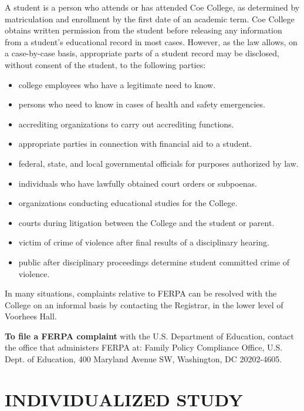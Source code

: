 \documentclass[
  letterpaper,
]{scrbook}
\providecommand{\tightlist}{%
  \setlength{\itemsep}{0pt}\setlength{\parskip}{0pt}}
\renewcommand{\part}[1]{\addcontentsline{toc}{part}{#1}}
\begin{document}
A student is a person who attends or has attended Coe College, as
determined by matriculation and enrollment by the first date of an
academic term. Coe College obtains written permission from the student
before releasing any information from a student's educational record in
most cases. However, as the law allows, on a case-by-case basis,
appropriate parts of a student record may be disclosed, without consent
of the student, to the following parties:

\begin{itemize}
\tightlist
\item
  college employees who have a legitimate need to know.
\item
  persons who need to know in cases of health and safety emergencies.
\item
  accrediting organizations to carry out accrediting functions.
\item
  appropriate parties in connection with financial aid to a student.
\item
  federal, state, and local governmental officials for purposes
  authorized by law.
\item
  individuals who have lawfully obtained court orders or subpoenas.
\item
  organizations conducting educational studies for the College.
\item
  courts during litigation between the College and the student or
  parent.
\item
  victim of crime of violence after final results of a disciplinary
  hearing.
\item
  public after disciplinary proceedings determine student committed
  crime of violence.
\end{itemize}

In many situations, complaints relative to FERPA can be resolved with
the College on an informal basis by contacting the Registrar, in the
lower level of Voorhees Hall.

\textbf{To file a FERPA complaint} with the U.S. Department of
Education, contact the office that administers FERPA at: Family Policy
Compliance Office, U.S. Dept. of Education, 400 Maryland Avenue SW,
Washington, DC 20202-4605.

\part{COURSES OF INSTRUCTION}

\chapter{INDIVIDUALIZED STUDY}\label{individualized-study}
\end{document}
